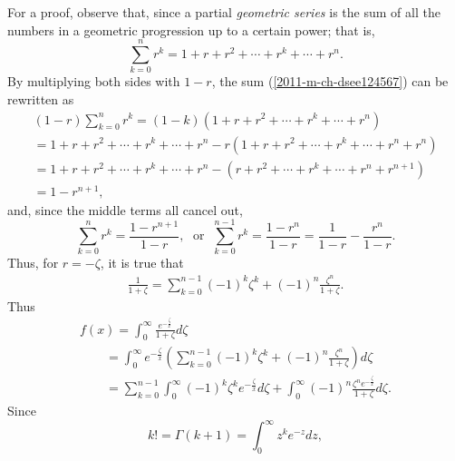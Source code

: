 {\color{OliveGreen}
\bproof

For a proof, observe that,
since
a partial {\em geometric series}
is the sum of all the numbers in a geometric progression up to a certain power;
that is,
\begin{equation}
\sum_{k=0}^n r^k =   1+r+r^2+ \cdots +r^k+ \cdots +r^n .
\label{2011-m-ch-dsee124567}
\end{equation}
By multiplying both sides with $1-r$,
the sum (\ref{2011-m-ch-dsee124567}) can be rewritten as
\begin{equation}
\begin{split}
(1-r) \sum_{k=0}^n r^k=
(1-k) (1+ r+r^2+ \cdots +r^k+ \cdots +r^n)\\
=1+ r+r^2+ \cdots +r^k+ \cdots +r^n -
r(1+r+r^2+ \cdots +r^k+ \cdots +r^n +r^{n}) \\
=1+ r+r^2+ \cdots +r^k+ \cdots +r^n -
(r+r^2+ \cdots +r^k+ \cdots +r^n +r^{n+1}) \\
= 1-r^{n+1}
,
\end{split}
\end{equation}
and, since the middle terms all cancel out,
\begin{equation}
\sum_{k=0}^n r^k =  \frac{1-r^{n+1}}{1-r},
\;
\textrm{ or }
\;
\sum_{k=0}^{n-1} r^k =  \frac{1-r^{n}}{1-r}  =  \frac{1}{1-r} - \frac{r^{n}}{1-r}
.
\label{2011-m-ch-dsee12}
\end{equation}
Thus, for $r=-\zeta$, it is true that
\begin{equation}
\begin{split}
\frac{1}{1+\zeta}=\sum_{k=0}^{n-1} (-1)^k \zeta^k + (-1)^n \frac{\zeta^n}{1+\zeta}.
\end{split}
\label{2011-m-ch-dsee13}
\end{equation}
Thus
\begin{equation}
\begin{split}
f(x) =\int_0^\infty \frac{e^{-\frac{\zeta}{x}}}{1+\zeta}d\zeta \\
\qquad =
\int_0^\infty  e^{-\frac{\zeta}{x}}\left(
\sum_{k=0}^{n-1} (-1)^k \zeta^k + (-1)^n \frac{\zeta^n}{1+\zeta}
\right)
d\zeta \\
\qquad =
\sum_{k=0}^{n-1}\int_0^\infty (-1)^k \zeta^k  e^{-\frac{\zeta}{x}}   d\zeta
 +
\int_0^\infty (-1)^n \frac{\zeta^ne^{-\frac{\zeta}{x}}}{1+\zeta}
d\zeta  .
\end{split}
\label{2011-m-ch-dsee14}
\end{equation}
Since
\begin{equation}
k!= \Gamma(k+1)=    \int_0^\infty z^k e^{-z} dz,

\end{equation}}
